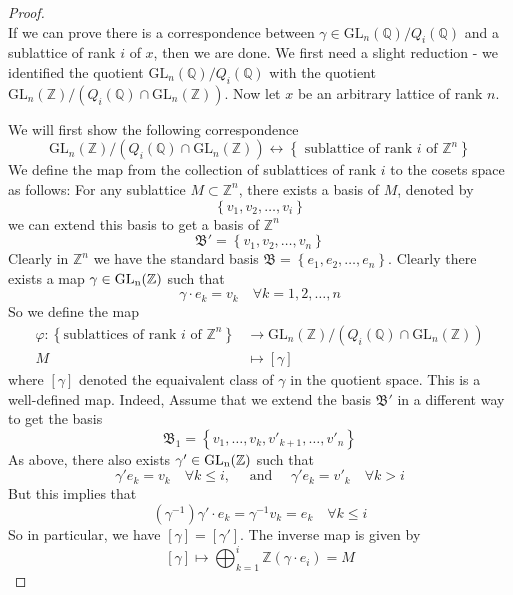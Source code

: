 \begin{proof}
    \hfill \\
    If we can prove there is a correspondence between
    $\gamma \in \text{GL}_n(\mathbb{Q})/Q_i(\mathbb{Q})$ and a sublattice of rank $i$ of $x$, then we are done.
    We first need a slight reduction - we identified the quotient $\text{GL}_n(\mathbb{Q})/Q_i(\mathbb{Q})$ with
    the quotient $\text{GL}_n(\mathbb{Z})/(Q_i(\mathbb{Q}) \cap \text{GL}_n(\mathbb{Z})) $. Now let $x$ be an arbitrary lattice of rank $n$.

    We will first show the following correspondence
    \[ \text{GL}_n(\mathbb{Z})/(Q_i(\mathbb{Q}) \cap \text{GL}_n(\mathbb{Z})) \longleftrightarrow \left\lbrace \text{ sublattice of rank $i$ of $\mathbb{Z}^n$}\right\rbrace\]
    We define the map from the collection of sublattices of rank $i$ to the cosets space as follows: For any sublattice $M \subset \mathbb{Z}^n$, there exists
    a basis of $M$, denoted by
    \[\left\lbrace v_1,v_2,\ldots, v_i \right\rbrace \]
    we can extend this basis to get a basis of $\mathbb{Z}^n$
    \[\mathfrak{B'} = \left\lbrace v_1,v_2,\ldots, v_n \right\rbrace \]
    Clearly in $\mathbb{Z}^n$ we have the standard basis $\mathfrak{B} = \left\lbrace e_1,e_2,\ldots,e_n\right\rbrace $. Clearly there
    exists a map $\gamma \in \operatorname{GL_n(\mathbb{Z})}$ such that
    \[\gamma \cdot e_k = v_k \quad \forall k = 1,2,\ldots, n\]
    So we define the map
    \begin{align*}
        \varphi \colon \left\lbrace\text{sublattices of rank $i$ of $\mathbb{Z}^n$}\right\rbrace & \to \text{GL}_n(\mathbb{Z})/(Q_i(\mathbb{Q}) \cap \text{GL}_n(\mathbb{Z})) \\
        M                                                                                        & \mapsto [\gamma]
    \end{align*}
    where $[\gamma]$ denoted the equaivalent class of $\gamma$ in the quotient space. This is a well-defined map. Indeed, Assume that we extend
    the basis $\mathfrak{B'}$ in a different way to get the basis
    \[ \mathfrak{B}_1 = \left\lbrace v_1,\ldots, v_k, v'_{k+1},\ldots,v'_n \right\rbrace\]
    As above, there also exists $\gamma' \in \operatorname{GL_n(\mathbb{Z})}$ such that
    \[\gamma' e_k = v_k \quad \forall k \le i, \quad \text{ and } \quad \gamma'e_k = v'_k \quad \forall k > i\]
    But this implies that
    \[(\gamma^{-1})\gamma ' \cdot e_k = \gamma^{-1} v_k = e_k \quad \forall k \le i\]
    So in particular, we have $[\gamma] = [\gamma']$. The inverse map is given by
    \[[\gamma] \mapsto \bigoplus_{k=1}^i\mathbb{Z} (\gamma \cdot e_i) = M\]

\end{proof}
